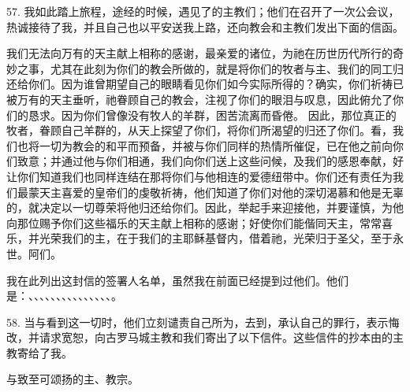 57. 我如此踏上旅程，途经的时候，遇见了的主教们；他们在召开了一次公会议，热诚接待了我，并且自己也以平安送我上路，还向教会和主教们发出下面的信函。\par

\par

我们无法向万有的天主献上相称的感谢，最亲爱的诸位，为祂在历世历代所行的奇妙之事，尤其在此刻为你们的教会所做的，就是将你们的牧者与主、我们的同工归还给你们。因为谁曾期望自己的眼睛看见你们如今实际所得的？确实，你们祈祷已被万有的天主垂听，祂眷顾自己的教会，注视了你们的眼泪与叹息，因此俯允了你们的恳求。因为你们曾像没有牧人的羊群，困苦流离而昏倦。 因此，那位真正的牧者，眷顾自己羊群的，从天上探望了你们，将你们所渴望的归还了你们。看，我们也将一切为教会的和平而预备，并被与你们同样的热情所催促，已在他之前向你们致意；并通过他与你们相通，我们向你们送上这些问候，及我们的感恩奉献，好让你们知道我们也同样连结在那将你们与他相连的爱德纽带中。你们还有责任为我们最蒙天主喜爱的皇帝们的虔敬祈祷，他们知道了你们对他的深切渴慕和他是无辜的，就决定以一切尊荣将他归还给你们。因此，举起手来迎接他，并要谨慎，为他向那位赐予你们这些福乐的天主献上相称的感谢；好使你们能偕同天主，常常喜乐，并光荣我们的主，在于我们的主耶稣基督内，借着祂，光荣归于圣父，至于永世。阿们。\par

我在此列出这封信的签署人名单，虽然我在前面已经提到过他们。他们是：、、、、、、、、、、、、、、、。\par

58. 当与看到这一切时，他们立刻谴责自己所为，去到，承认自己的罪行，表示悔改，并请求宽恕，向古罗马城主教和我们寄出了以下信件。这些信件的抄本由的主教寄给了我。\par

\par

与致至可颂扬的主、教宗。\par

